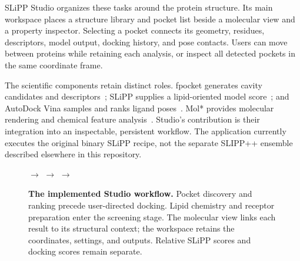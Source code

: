 \documentclass[10pt,a4paper]{article}
\begin{document}
SLiPP Studio organizes these tasks around the protein structure. Its main workspace places a structure library and pocket list beside a molecular view and a property inspector. Selecting a pocket connects its geometry, residues, descriptors, model output, docking history, and pose contacts. Users can move between proteins while retaining each analysis, or inspect all detected pockets in the same coordinate frame.

The scientific components retain distinct roles. fpocket generates cavity candidates and descriptors~\cite{fpocket}; SLiPP supplies a lipid-oriented model score~\cite{slipp}; and AutoDock Vina samples and ranks ligand poses~\cite{vina,vina12}. Mol* provides molecular rendering and chemical feature analysis~\cite{molstar}. Studio's contribution is their integration into an inspectable, persistent workflow. The application currently executes the original binary SLiPP recipe, not the separate SLIPP++ ensemble described elsewhere in this repository.

\begin{figure}[t]
\centering
\setlength{\fboxsep}{6pt}
\hfill$\longrightarrow$\hfill
{}
\hfill$\longrightarrow$\hfill
{}
\hfill$\longrightarrow$\hfill
{}
\caption{\textbf{The implemented Studio workflow.} Pocket discovery and ranking precede user-directed docking. Lipid chemistry and receptor preparation enter the screening stage. The molecular view links each result to its structural context; the workspace retains the coordinates, settings, and outputs. Relative SLiPP scores and docking scores remain separate.}
\end{figure}
\end{document}
